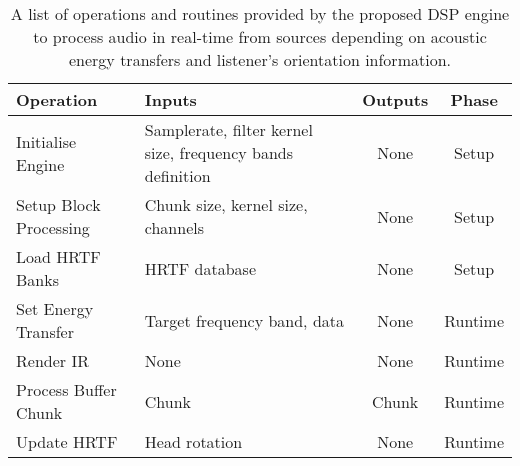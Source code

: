 \begin{table}[tbp]
    \centering
    \begin{tabularx}{1\linewidth}{lXcc}
    \toprule
    Operation                               & Inputs                                                     & Outputs & Phase   \\ \midrule
    Initialise Engine                       & Samplerate, filter kernel size, frequency bands definition & None    & Setup   \\
    Setup Block Processing                  & Chunk size, kernel size, channels                          & None    & Setup   \\
    Load HRTF Banks                         & HRTF database                                              & None    & Setup   \\
    \nohyphens{Set Energy Transfer}         & Target frequency band, data                                & None    & Runtime \\
    Render IR                               & None                                                       & None    & Runtime \\
    Process Buffer Chunk                    & Chunk                                                      & Chunk   & Runtime \\
    Update HRTF                             & Head rotation                                              & None    & Runtime \\ \bottomrule
    \end{tabularx}
    \caption{A list of operations and routines provided by the proposed DSP engine to process audio in real-time from sources depending on acoustic energy transfers and listener's orientation information. }
    \label{tab:dsptb-interface}
    \end{table}